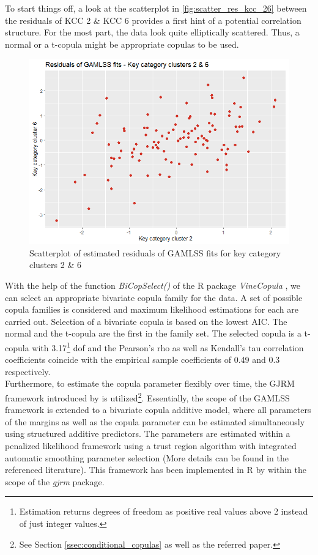 
To start things off, a look at the scatterplot in \autoref{fig:scatter_res_kcc_26} between the residuals of \ac{KCC} 2 \& \ac{KCC} 6 provides a first hint of a potential correlation structure. For the most part, the data look quite elliptically scattered. Thus, a normal or a t-copula might be appropriate copulas to be used.
\\


\begin{figure}[H]
\centering
  \includegraphics[width=0.45\linewidth]{figures/scatter_res_kcc_26.png}
  \caption{Scatterplot of estimated residuals of GAMLSS fits for key category clusters 2 \& 6}
  \label{fig:scatter_res_kcc_26}
\end{figure}

With the help of the function \textit{BiCopSelect()} of the R package \textit{VineCopula} \citep{nagler2019vinecopula}, we can select an appropriate bivariate copula family for the data. A set of possible copula families is considered and maximum likelihood estimations for each are carried out. Selection of a bivariate copula is based on the lowest \ac{AIC}. The normal and the t-copula are the first in the family set. The selected copula is a t-copula with 3.17\footnote{Estimation returns degrees of freedom as positive real values above 2 instead of just integer values.} \ac{dof} and the Pearson's rho as well as Kendall's tau correlation coefficients coincide with the empirical sample coefficients of 0.49 and 0.3 respectively.
\\

Furthermore, to estimate the copula parameter flexibly over time, the \ac{GJRM} framework introduced by \cite{marra1605bivariate} is utilized\footnote{See Section \ref{ssec:conditional_copulas} as well as the referred paper.}. Essentially, the scope of the \ac{GAMLSS} framework is extended to a bivariate copula additive model, where all parameters of the margins as well as the copula parameter can be estimated simultaneously using structured additive predictors. The parameters are estimated within a penalized likelihood framework using a trust region algorithm with integrated automatic smoothing parameter selection (More details can be found in the referenced literature). This framework has been implemented in R by \cite{marragjrm} within the scope of the \textit{gjrm} package. \\

